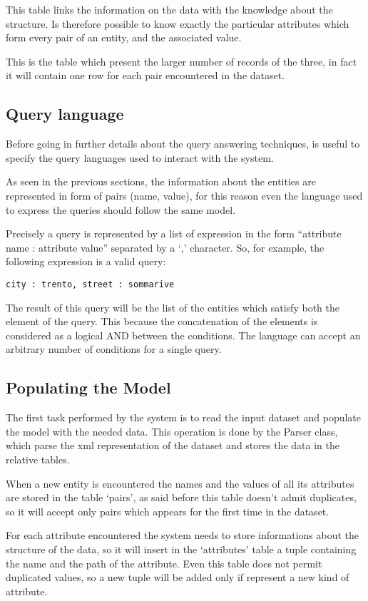 \documentclass{acm_proc_article-sp-sigmod07}
\begin{document}
This table links the information on the data with the knowledge about the
structure. Is therefore possible to know exactly the particular attributes
which form every pair of an entity, and the associated value.

This is the table which present the larger number of records of the three,
in fact it will contain one row for each pair encountered in the dataset.

\subsection{Query language}
Before going in further details about the query answering techniques, is
useful to specify the query languages used to interact with the system.

As seen in the previous sections, the information about the entities are
represented in form of pairs (name, value), for this reason even the
language used to express the queries should follow the same model.

Precisely a query is represented by a list of expression in the form
``attribute name : attribute value'' separated by a `,' character.
So, for example, the following expression is a valid query: 

\begin{verbatim}
city : trento, street : sommarive
\end{verbatim}

The result of this query will be the list of the entities which satisfy
both the element of the query.
This because the concatenation of the elements is considered as a logical
AND between the conditions.
The language can accept an arbitrary number of conditions for a single
query.

\subsection{Populating the Model}
The first task performed by the system is to read the input dataset and
populate the model with the needed data.
This operation is done by the Parser class, which parse the xml
representation of the dataset and stores the data in the relative tables.

When a new entity is encountered the names and the values of all its
attributes are stored in the table `pairs', as said before this table
doesn't admit duplicates, so it will accept only pairs which appears for
the first time in the dataset.

For each attribute encountered the system needs to store informations
about the structure of the data, so it will insert in the `attributes'
table a tuple containing the name and the path of the attribute.
Even this table does not permit duplicated values, so a new tuple will be
added only if represent a new kind of attribute.
\end{document}
